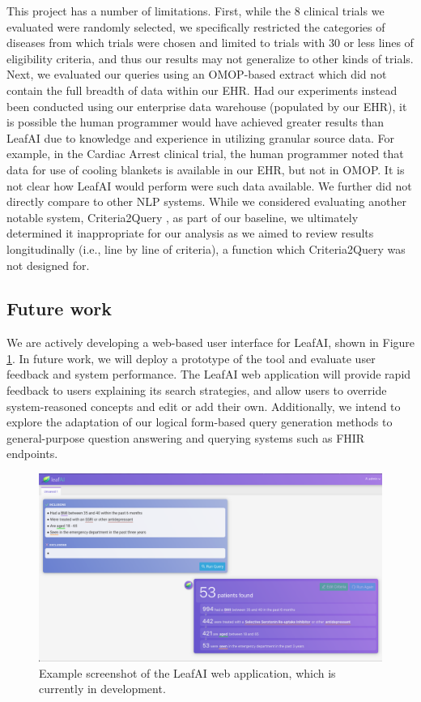 \documentclass[../main.tex]{subfiles}
\begin{document}
This project has a number of limitations. First, while the 8 clinical trials we evaluated were randomly selected, we specifically restricted the categories of diseases from which trials were chosen and limited to trials with 30 or less lines of eligibility criteria, and thus our results may not generalize to other kinds of trials. Next, we evaluated our queries using an OMOP-based extract which did not contain the full breadth of data within our EHR. Had our experiments instead been conducted using our enterprise data warehouse (populated by our EHR), it is possible the human programmer would have achieved greater results than LeafAI due to knowledge and experience in utilizing granular source data. For example, in the Cardiac Arrest clinical trial, the human programmer noted that data for use of cooling blankets is available in our EHR, but not in OMOP. It is not clear how LeafAI would perform were such data available. We further did not directly compare to other NLP systems. While we considered evaluating another notable system, Criteria2Query \cite{yuan2019criteria2query}, as part of our baseline, we ultimately determined it inappropriate for our analysis as we aimed to review results longitudinally (i.e., line by line of criteria), a function which Criteria2Query was not designed for. 

\subsection*{Future work}

We are actively developing a web-based user interface for LeafAI, shown in Figure \ref{fig_leafai_screenshot}. In future work, we will deploy a prototype of the tool and evaluate user feedback and system performance. The LeafAI web application will provide rapid feedback to users explaining its search strategies, and allow users to override system-reasoned concepts and edit or add their own. Additionally, we intend to explore the adaptation of our logical form-based query generation methods to general-purpose question answering and querying systems such as FHIR endpoints.

\begin{figure}[H]
  \includegraphics[scale=0.26]{figures/leafai_screenshot.png}  
\caption{Example screenshot of the LeafAI web application, which is currently in development.}
\label{fig_leafai_screenshot}
\end{figure}
\end{document}
